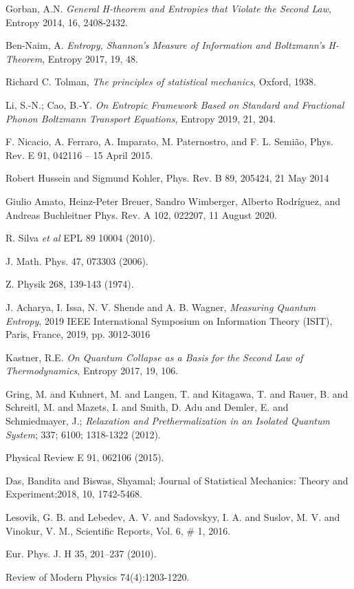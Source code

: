 \documentclass{article}
\begin{document}
\begin{thebibliography}{}
Gorban, A.N. {\it General H-theorem and Entropies that Violate the Second Law}, Entropy 2014, 16, 2408-2432.

Ben-Naim, A. {\it Entropy, Shannon’s Measure of Information and Boltzmann’s H-Theorem}, Entropy 2017, 19, 48.

 Richard C. Tolman, \emph{The principles of statistical mechanics}, Oxford, 1938.

Li, S.-N.; Cao, B.-Y. {\it On Entropic Framework Based on Standard and Fractional Phonon Boltzmann Transport Equations}, Entropy 2019, 21, 204.


F. Nicacio, A. Ferraro, A. Imparato, M. Paternostro, and F. L. Semião,
Phys. Rev. E 91, 042116 – 15 April 2015.

Robert Hussein and Sigmund Kohler,
Phys. Rev. B 89, 205424, 21 May 2014

Giulio Amato, Heinz-Peter Breuer, Sandro Wimberger, Alberto Rodríguez, and Andreas Buchleitner
Phys. Rev. A 102, 022207, 11 August 2020.

R. Silva {\it et al} EPL 89 10004 (2010).

J. Math. Phys. 47, 073303 (2006).

Z. Physik 268, 139-143 (1974).

J. Acharya, I. Issa, N. V. Shende and A. B. Wagner, {\it Measuring Quantum Entropy}, 2019 IEEE International Symposium on Information Theory (ISIT), Paris, France, 2019, pp. 3012-3016

Kastner, R.E. {\it On Quantum Collapse as a Basis for the Second Law of Thermodynamics}, Entropy 2017, 19, 106.



Gring, M. and Kuhnert, M. and Langen, T. and Kitagawa, T. and Rauer, B. and Schreitl, M. and Mazets, I. and Smith, D. Adu and Demler, E. and Schmiedmayer, J.; {\it Relaxation and Prethermalization in an Isolated Quantum System}; 337; 6100; 1318-1322 (2012).

Physical Review E 91, 062106 (2015).




Das, Bandita and Biswas, Shyamal; Journal of Statistical Mechanics: Theory and Experiment;2018, 10, 1742-5468. 

Lesovik, G. B. and Lebedev, A. V. and Sadovskyy, I. A. and Suslov, M. V. and Vinokur, V. M., Scientific Reports, Vol. 6, \# 1, 2016.

Eur. Phys. J. H 35, 201–237 (2010).

Review of Modern Physics 74(4):1203-1220.




\end{thebibliography}{}
\end{document}

